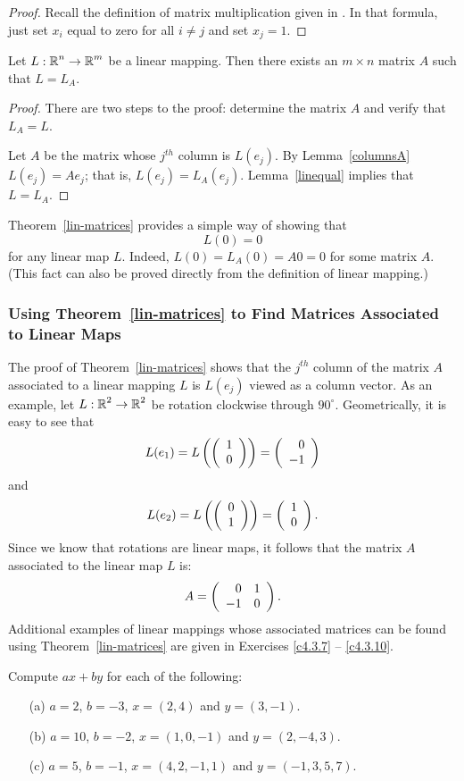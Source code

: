 \documentclass{ximera}
\begin{document}
\begin{proof}  Recall the definition of matrix multiplication given in .
In that formula, just set $x_i$ equal to zero for all $i\neq j$ and set
$x_j=1$. \end{proof}

\begin{theorem}  \label{lin-matrices}
Let $L:\mbox{$\Bbb{R}$}^n\to\mbox{$\Bbb{R}$}^m$ be a linear mapping.
Then there exists an $m\times n$ matrix $A$ such that $L=L_A$.
\end{theorem}

\begin{proof}
There are two steps to the proof: determine the matrix $A$ and
verify that $L_A=L$.

Let $A$ be the matrix whose $j^{th}$ column is $L(e_j)$.  By
Lemma~\ref{columnsA} $L(e_j) = Ae_j$; that is, $L(e_j) = L_A(e_j)$.
Lemma~\ref{linequal} implies that $L=L_A$.  \end{proof}

Theorem~\ref{lin-matrices} provides a simple way of showing that
\[
L(0) = 0
\]
for any linear map $L$.  Indeed, $L(0)=L_A(0)=A0=0$ for some matrix $A$.  
(This fact can also be proved directly from the definition of linear mapping.)

\subsubsection*{Using Theorem~\protect\ref{lin-matrices} to Find Matrices
Associated to Linear Maps}

The proof of Theorem~\ref{lin-matrices} shows that the $j^{th}$ column of the
matrix $A$ associated to a linear mapping $L$ is $L(e_j)$ viewed as a column
vector.  As an example, let $L:\mbox{$\Bbb{R}$}^2\to\mbox{$\Bbb{R}$}^2$ be rotation clockwise through
$90^\circ$.  Geometrically, it is easy to see that
\[
  L(e_1) = L\left(\left(\begin{array}{r} 1 \\ 0\end{array}\right)\right) = \left(\begin{array}{r} 0 \\ -1\end{array}\right)
\]
and
\[
L(e_2) = L\left(\left(\begin{array}{r} 0 \\ 1\end{array}\right)\right) = \left(\begin{array}{r} 1 \\ 0\end{array}\right).
\]
Since we know that rotations are linear maps, it follows that the matrix
$A$ associated to the linear map $L$ is:
\[
A = \left(\begin{array}{rr} 0 & 1\\ -1 &0\end{array}\right).
\]
Additional examples of linear mappings whose associated matrices can be found
using Theorem~\ref{lin-matrices} are given in Exercises \ref{c4.3.7} --
\ref{c4.3.10}.



\EXER

\TEXER

\begin{exercise} \label{c4.3.1}
Compute $ax+by$ for each of the following:
\begin{itemize}
\item[(a)] $a=2$, $b=-3$, $x=(2,4)$ and $y=(3,-1)$.
\item[(b)] $a=10$, $b=-2$, $x=(1,0,-1)$ and $y=(2,-4,3)$.
\item[(c)] $a=5$, $b=-1$, $x=(4,2,-1,1)$ and $y=(-1,3,5,7)$.
\end{itemize}
\end{exercise}
\end{document}
